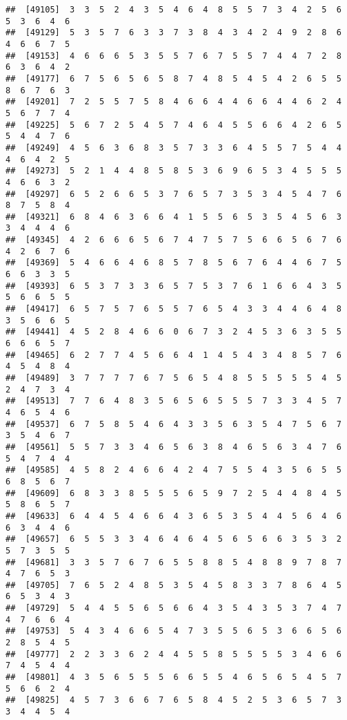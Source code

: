 \documentclass[
]{book}
\begin{document}
\begin{verbatim}
##  [49105]  3  3  5  2  4  3  5  4  6  4  8  5  5  7  3  4  2  5  6  5  3  6  4  6
##  [49129]  5  3  5  7  6  3  3  7  3  8  4  3  4  2  4  9  2  8  6  4  6  6  7  5
##  [49153]  4  6  6  6  5  3  5  5  7  6  7  5  5  7  4  4  7  2  8  6  3  6  4  2
##  [49177]  6  7  5  6  5  6  5  8  7  4  8  5  4  5  4  2  6  5  5  8  6  7  6  3
##  [49201]  7  2  5  5  7  5  8  4  6  6  4  4  6  6  4  4  6  2  4  5  6  7  7  4
##  [49225]  5  6  7  2  5  4  5  7  4  6  4  5  5  6  6  4  2  6  5  5  4  4  7  6
##  [49249]  4  5  6  3  6  8  3  5  7  3  3  6  4  5  5  7  5  4  4  4  6  4  2  5
##  [49273]  5  2  1  4  4  8  5  8  5  3  6  9  6  5  3  4  5  5  5  4  6  6  3  2
##  [49297]  6  5  2  6  6  5  3  7  6  5  7  3  5  3  4  5  4  7  6  8  7  5  8  4
##  [49321]  6  8  4  6  3  6  6  4  1  5  5  6  5  3  5  4  5  6  3  3  4  4  4  6
##  [49345]  4  2  6  6  6  5  6  7  4  7  5  7  5  6  6  5  6  7  6  4  2  6  7  6
##  [49369]  5  4  6  6  4  6  8  5  7  8  5  6  7  6  4  4  6  7  5  6  6  3  3  5
##  [49393]  6  5  3  7  3  3  6  5  7  5  3  7  6  1  6  6  4  3  5  5  6  6  5  5
##  [49417]  6  5  7  5  7  6  5  5  7  6  5  4  3  3  4  4  6  4  8  3  5  6  6  5
##  [49441]  4  5  2  8  4  6  6  0  6  7  3  2  4  5  3  6  3  5  5  6  6  6  5  7
##  [49465]  6  2  7  7  4  5  6  6  4  1  4  5  4  3  4  8  5  7  6  4  5  4  8  4
##  [49489]  3  7  7  7  7  6  7  5  6  5  4  8  5  5  5  5  5  4  5  2  4  7  3  4
##  [49513]  7  7  6  4  8  3  5  6  5  6  5  5  5  7  3  3  4  5  7  4  6  5  4  6
##  [49537]  6  7  5  8  5  4  6  4  3  3  5  6  3  5  4  7  5  6  7  3  5  4  6  7
##  [49561]  5  5  7  3  3  4  6  5  6  3  8  4  6  5  6  3  4  7  6  5  4  7  4  4
##  [49585]  4  5  8  2  4  6  6  4  2  4  7  5  5  4  3  5  6  5  5  6  8  5  6  7
##  [49609]  6  8  3  3  8  5  5  5  6  5  9  7  2  5  4  4  8  4  5  5  8  6  5  7
##  [49633]  6  4  4  5  4  6  6  4  3  6  5  3  5  4  4  5  6  4  6  6  3  4  4  6
##  [49657]  6  5  5  3  3  4  6  4  6  4  5  6  5  6  6  3  5  3  2  5  7  3  5  5
##  [49681]  3  3  5  7  6  7  6  5  5  8  8  5  4  8  8  9  7  8  7  4  7  6  5  3
##  [49705]  7  6  5  2  4  8  5  3  5  4  5  8  3  3  7  8  6  4  5  6  5  3  4  3
##  [49729]  5  4  4  5  5  6  5  6  6  4  3  5  4  3  5  3  7  4  7  4  7  6  6  4
##  [49753]  5  4  3  4  6  6  5  4  7  3  5  5  6  5  3  6  6  5  6  2  8  5  4  5
##  [49777]  2  2  3  3  6  2  4  4  5  5  8  5  5  5  5  3  4  6  6  7  4  5  4  4
##  [49801]  4  3  5  6  5  5  5  6  6  5  5  4  6  5  6  5  4  5  7  5  6  6  2  4
##  [49825]  4  5  7  3  6  6  7  6  5  8  4  5  2  5  3  6  5  7  3  3  4  4  5  4

\end{verbatim}
\end{document}
